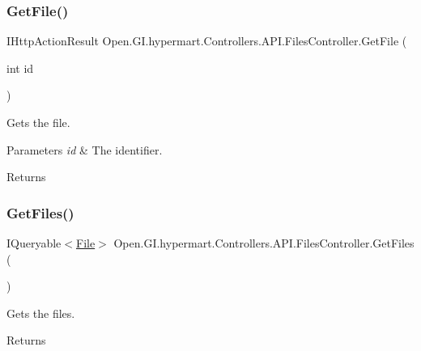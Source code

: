 \subsubsection{\texorpdfstring{Get\+File()}{GetFile()}}
{\footnotesize\ttfamily I\+Http\+Action\+Result Open.\+G\+I.\+hypermart.\+Controllers.\+A\+P\+I.\+Files\+Controller.\+Get\+File (\begin{DoxyParamCaption}\item[{int}]{id }\end{DoxyParamCaption})}



Gets the file. 


\begin{DoxyParams}{Parameters}
{\em id} & The identifier.\\
\hline
\end{DoxyParams}
\begin{DoxyReturn}{Returns}

\end{DoxyReturn}
\hypertarget{class_open_1_1_g_i_1_1hypermart_1_1_controllers_1_1_a_p_i_1_1_files_controller_ab9860e1f780182dd01086d07e8bbab65}{}\label{class_open_1_1_g_i_1_1hypermart_1_1_controllers_1_1_a_p_i_1_1_files_controller_ab9860e1f780182dd01086d07e8bbab65} 
\subsubsection{\texorpdfstring{Get\+Files()}{GetFiles()}}
{\footnotesize\ttfamily I\+Queryable$<$\hyperlink{class_open_1_1_g_i_1_1hypermart_1_1_models_1_1_file}{File}$>$ Open.\+G\+I.\+hypermart.\+Controllers.\+A\+P\+I.\+Files\+Controller.\+Get\+Files (\begin{DoxyParamCaption}{ }\end{DoxyParamCaption})}



Gets the files. 

\begin{DoxyReturn}{Returns}

\end{DoxyReturn}
\hypertarget{class_open_1_1_g_i_1_1hypermart_1_1_controllers_1_1_a_p_i_1_1_files_controller_a4c176da21d23430d23010248e644d61b}{}\label{class_open_1_1_g_i_1_1hypermart_1_1_controllers_1_1_a_p_i_1_1_files_controller_a4c176da21d23430d23010248e644d61b} 
